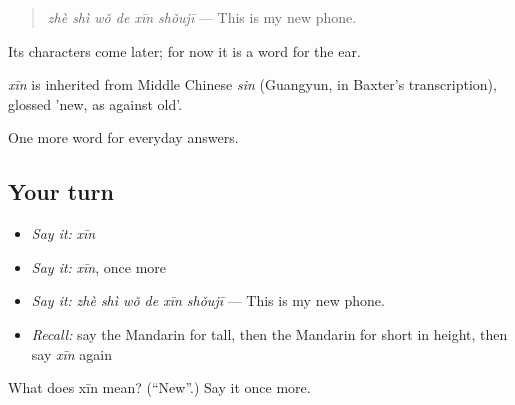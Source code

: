 \begin{quote}
\emph{zhè shì wǒ de xīn shǒujī} — This is my new phone.
\end{quote}

Its characters come later; for now it is a word for the ear.

\begin{cousinweb}
\emph{xīn} is inherited from Middle Chinese \emph{sin} (Guangyun, in Baxter's transcription), glossed 'new, as against old'.
\end{cousinweb}

\begin{grammarlens}[title={What you've built}]
One more word for everyday answers.
\end{grammarlens}

\subsection*{Your turn}
\begin{itemize}
\raggedright
  \item \emph{Say it:} \emph{xīn}
  \item \emph{Say it:} \emph{xīn}, once more
  \item \emph{Say it:} \emph{zhè shì wǒ de xīn shǒujī} — This is my new phone.
  \item \emph{Recall:} say the Mandarin for tall, then the Mandarin for short in height, then say \emph{xīn} again
\end{itemize}

\begin{tcolorbox}[breakable,colback=teal!4,colframe=teal!35!black,title={Before you move on}]
What does xīn mean? (\textquotedblleft{}New\textquotedblright{}.) Say it once more.
\end{tcolorbox}

